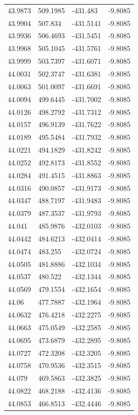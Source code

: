 \begin{table}[H]
\begin{tabular}{llll}
43.9873 & 509.1985 & -431.483 & -9.8085 \\
43.9904 & 507.834 & -431.5141 & -9.8085 \\
43.9936 & 506.4693 & -431.5451 & -9.8085 \\
43.9968 & 505.1045 & -431.5761 & -9.8085 \\
43.9999 & 503.7397 & -431.6071 & -9.8085 \\
44.0031 & 502.3747 & -431.6381 & -9.8085 \\
44.0063 & 501.0097 & -431.6691 & -9.8085 \\
44.0094 & 499.6445 & -431.7002 & -9.8085 \\
44.0126 & 498.2792 & -431.7312 & -9.8085 \\
44.0157 & 496.9139 & -431.7622 & -9.8085 \\
44.0189 & 495.5484 & -431.7932 & -9.8085 \\
44.0221 & 494.1829 & -431.8242 & -9.8085 \\
44.0252 & 492.8173 & -431.8552 & -9.8085 \\
44.0284 & 491.4515 & -431.8863 & -9.8085 \\
44.0316 & 490.0857 & -431.9173 & -9.8085 \\
44.0347 & 488.7197 & -431.9483 & -9.8085 \\
44.0379 & 487.3537 & -431.9793 & -9.8085 \\
44.041 & 485.9876 & -432.0103 & -9.8085 \\
44.0442 & 484.6213 & -432.0414 & -9.8085 \\
44.0474 & 483.255 & -432.0724 & -9.8085 \\
44.0505 & 481.8886 & -432.1034 & -9.8085 \\
44.0537 & 480.522 & -432.1344 & -9.8085 \\
44.0569 & 479.1554 & -432.1654 & -9.8085 \\
44.06 & 477.7887 & -432.1964 & -9.8085 \\
44.0632 & 476.4218 & -432.2275 & -9.8085 \\
44.0663 & 475.0549 & -432.2585 & -9.8085 \\
44.0695 & 473.6879 & -432.2895 & -9.8085 \\
44.0727 & 472.3208 & -432.3205 & -9.8085 \\
44.0758 & 470.9536 & -432.3515 & -9.8085 \\
44.079 & 469.5863 & -432.3825 & -9.8085 \\
44.0822 & 468.2188 & -432.4136 & -9.8085 \\
44.0853 & 466.8513 & -432.4446 & -9.8085 \\

\end{tabular}
\end{table}
